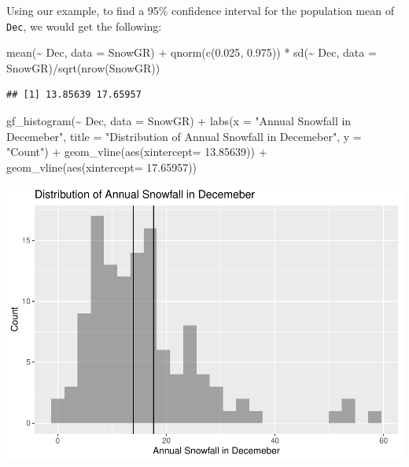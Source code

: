 \documentclass[12pt]{article}
\newenvironment{Shaded}{\begin{snugshade}}{\end{snugshade}}
\newcommand{\AttributeTok}[1]{\textcolor[rgb]{0.77,0.63,0.00}{#1}}
\newcommand{\FloatTok}[1]{\textcolor[rgb]{0.00,0.00,0.81}{#1}}
\newcommand{\FunctionTok}[1]{\textcolor[rgb]{0.00,0.00,0.00}{#1}}
\newcommand{\NormalTok}[1]{#1}
\newcommand{\SpecialCharTok}[1]{\textcolor[rgb]{0.00,0.00,0.00}{#1}}
\newcommand{\StringTok}[1]{\textcolor[rgb]{0.31,0.60,0.02}{#1}}
\begin{document}
Using our example, to find a 95\% confidence interval for the population
mean of \texttt{Dec}, we would get the following:

\begin{Shaded}
\begin{Highlighting}[]
\FunctionTok{mean}\NormalTok{(}\SpecialCharTok{\textasciitilde{}}\NormalTok{ Dec, }\AttributeTok{data =}\NormalTok{ SnowGR) }\SpecialCharTok{+} \FunctionTok{qnorm}\NormalTok{(}\FunctionTok{c}\NormalTok{(}\FloatTok{0.025}\NormalTok{, }\FloatTok{0.975}\NormalTok{)) }\SpecialCharTok{*} 
  \FunctionTok{sd}\NormalTok{(}\SpecialCharTok{\textasciitilde{}}\NormalTok{ Dec, }\AttributeTok{data =}\NormalTok{ SnowGR)}\SpecialCharTok{/}\FunctionTok{sqrt}\NormalTok{(}\FunctionTok{nrow}\NormalTok{(SnowGR))}
\end{Highlighting}
\end{Shaded}

\begin{verbatim}
## [1] 13.85639 17.65957
\end{verbatim}

\begin{Shaded}
\begin{Highlighting}[]
\FunctionTok{gf\_histogram}\NormalTok{(}\SpecialCharTok{\textasciitilde{}}\NormalTok{ Dec, }\AttributeTok{data =}\NormalTok{ SnowGR) }\SpecialCharTok{+}
  \FunctionTok{labs}\NormalTok{(}\AttributeTok{x =} \StringTok{"Annual Snowfall in Decemeber"}\NormalTok{, }
       \AttributeTok{title =} \StringTok{"Distribution of Annual Snowfall in Decemeber"}\NormalTok{, }\AttributeTok{y =} \StringTok{"Count"}\NormalTok{) }\SpecialCharTok{+}
  \FunctionTok{geom\_vline}\NormalTok{(}\FunctionTok{aes}\NormalTok{(}\AttributeTok{xintercept=} \FloatTok{13.85639}\NormalTok{)) }\SpecialCharTok{+}
  \FunctionTok{geom\_vline}\NormalTok{(}\FunctionTok{aes}\NormalTok{(}\AttributeTok{xintercept=} \FloatTok{17.65957}\NormalTok{))}
\end{Highlighting}
\end{Shaded}

\includegraphics{paper_files/figure-latex/unnamed-chunk-5-1.pdf}
\end{document}
